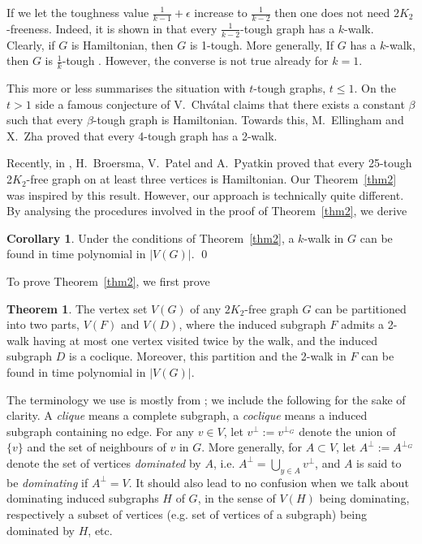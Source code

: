 \documentclass{amsart}
\theoremstyle{definition}
\newtheorem{theorem}{Theorem}
\newtheorem{corollary}{Corollary}
\begin{document}
If we let the toughness value $\frac{1}{k-1}+\epsilon$ increase to 
$\frac{1}{k-2}$ then
one does not need $2K_2$-freeness. Indeed, it is shown in 
\cite{jackson1990k} that
every $\frac{1}{k-2}$-tough graph has a $k$-walk. 
Clearly, if $G$ is
Hamiltonian, then $G$ is 1-tough.  More generally, 
If $G$ has a $k$-walk, then $G$ is $\frac{1}{k}$-tough \cite{jackson1990k}.
However, the converse is not true already for $k=1$.  

This more or less summarises the situation with $t$-tough graphs, $t\leq 1$.
On the $t>1$ side 
a famous conjecture of V.~Chv\'{a}tal \cite{chvatal1973tough} claims
that there exists a constant $\beta$ such that every
$\beta$-tough graph is Hamiltonian.  
Towards this, 
M.~Ellingham and X.~Zha \cite{ellingham2000toughness} proved that
every 4-tough graph has a 2-walk.

Recently, in \cite{broersma2014toughness}, H.~Broersma, V.~Patel and A.~Pyatkin proved that 
every 25-tough 2$K_2$-free graph on at least three vertices is Hamiltonian.
Our Theorem~\ref{thm2} was inspired by this result.  
However, our approach is technically quite different. 
By analysing the procedures involved in the proof of Theorem~\ref{thm2}, 
we derive
\begin{corollary}\label{alg}
Under the conditions of Theorem~\ref{thm2}, a $k$-walk in $G$ can be found in
time polynomial in $|V(G)|$. \qed
\end{corollary}

To prove Theorem~\ref{thm2}, we first prove
\begin{theorem}\label{addgen1} 
The  vertex set $V(G)$ of any $2K_2$-free graph $G$
can be partitioned into two parts, $V(F)$ and $V(D)$, where the
induced subgraph $F$ admits a 2-walk having at most one vertex visited twice by
the walk, and the induced subgraph $D$ is a coclique. Moreover, this
partition and the 2-walk in $F$ can be found in time polynomial in $|V(G)|$.
\end{theorem}

The terminology we use is  mostly from \cite{bomu08}; we include the following for the sake of
clarity.  
A {\em clique} means a complete subgraph, a {\em coclique} means a
induced subgraph containing no edge. 
For any
$v\in V$, let $v^\perp:=v^{\perp_G}$ denote the union of $\{v\}$ and the set of
neighbours of $v$ in $G$.  More generally, for $A\subset V$, let
$A^\perp:=A^{\perp_G}$ denote the set of vertices {\em dominated} by $A$, i.e.
$A^\perp=\bigcup\limits_{y\in A}v^\perp$, and $A$ is said to be {\em
dominating} if $A^\perp=V$.  It should also lead to no confusion when we talk
about  dominating induced subgraphs $H$ of $G$, in the sense of $V(H)$ being
dominating, respectively a subset of vertices (e.g. set of vertices of a
subgraph) being dominated by $H$, etc.
\end{document}
